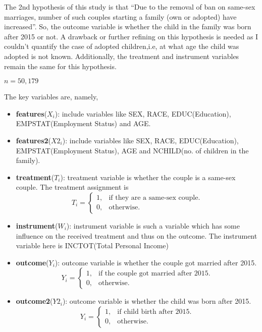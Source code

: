 \documentclass[11pt, a4paper, leqno]{article}
\begin{document}
The 2nd hypothesis of this study is that ``Due to the removal of ban on same-sex marriages, number of such couples starting a family (own or
adopted) have increased''.
So, the outcome variable is whether the child in the family was born after 2015 or not.
A drawback or further refining
on this hypothesis is needed as I couldn't quantify the case of adopted children,i.e, at what age the child was adopted is not known.
Additionally, the treatment and instrument variables remain the same for this hypothesis.

$n = 50,179$

The key variables are, namely,
\begin{itemize}
    \item \textbf{features}($X_i$): include variables like SEX, RACE, EDUC(Education), EMPSTAT(Employment Status) and AGE.
    \item \textbf{features2}($X2_i$): include variables like SEX, RACE, EDUC(Education), EMPSTAT(Employment Status), AGE and
                                    NCHILD(no. of children in the family).
    \item \textbf{treatment}($T_i$): treatment variable is whether the couple is a same-sex couple. The treatment assignment is
     \[T_i=\begin{cases}
               1, & \text{if they are a same-sex couple}.\\
               0, & \text{otherwise}.
                   \end{cases}\]
    \item \textbf{instrument}($W_i$): instrument variable is such a variable which has some influence on the received treatment and thus on
                                    the outcome. The instrument variable here is INCTOT(Total Personal Income)
    \item \textbf{outcome}($Y_i$): outcome variable is whether the couple got married after 2015.
     \[Y_i=\begin{cases}
               1, & \text{if the couple got married after 2015}.\\
               0, & \text{otherwise}.
                   \end{cases}\]
    \item \textbf{outcome2}($Y2_i$): outcome variable is whether the child was born after 2015.
     \[Y_i=\begin{cases}
               1, & \text{if child birth after 2015}.\\
               0, & \text{otherwise}.
                   \end{cases}\]
\end{itemize}
\end{document}
